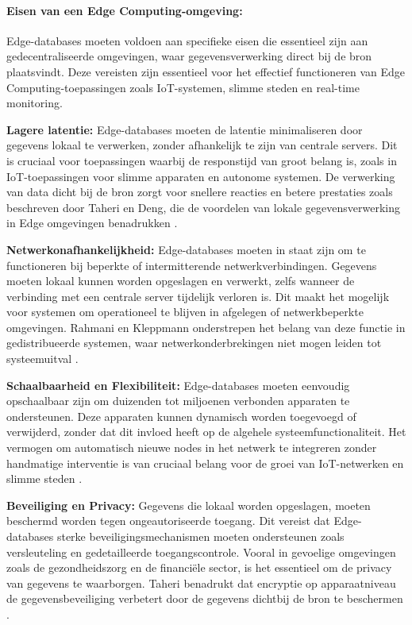 \paragraph{Eisen van een Edge Computing-omgeving:}
Edge-databases moeten voldoen aan specifieke eisen die essentieel zijn aan gedecentraliseerde omgevingen, waar gegevensverwerking direct bij de bron plaatsvindt. Deze vereisten zijn essentieel voor het effectief functioneren van Edge Computing-toepassingen zoals IoT-systemen, slimme steden en real-time monitoring.

\textbf{Lagere latentie:} 
   Edge-databases moeten de latentie minimaliseren door gegevens lokaal te verwerken, zonder afhankelijk te zijn van centrale servers. Dit is cruciaal voor toepassingen waarbij de responstijd van groot belang is, zoals in IoT-toepassingen voor slimme apparaten en autonome systemen. De verwerking van data dicht bij de bron zorgt voor snellere reacties en betere prestaties zoals beschreven door Taheri en Deng, die de voordelen van lokale gegevensverwerking in Edge omgevingen benadrukken \autocite{Taheri2020}.

\textbf{Netwerkonafhankelijkheid:}
   Edge-databases moeten in staat zijn om te functioneren bij beperkte of intermitterende netwerkverbindingen. Gegevens moeten lokaal kunnen worden opgeslagen en verwerkt, zelfs wanneer de verbinding met een centrale server tijdelijk verloren is. Dit maakt het mogelijk voor systemen om operationeel te blijven in afgelegen of netwerkbeperkte omgevingen. Rahmani en Kleppmann onderstrepen het belang van deze functie in gedistribueerde systemen, waar netwerkonderbrekingen niet mogen leiden tot systeemuitval \autocite{Rahmani2018, Kleppmann2017}.

\textbf{Schaalbaarheid en Flexibiliteit:}
   Edge-databases moeten eenvoudig opschaalbaar zijn om duizenden tot miljoenen verbonden apparaten te ondersteunen. Deze apparaten kunnen dynamisch worden toegevoegd of verwijderd, zonder dat dit invloed heeft op de algehele systeemfunctionaliteit. Het vermogen om automatisch nieuwe nodes in het netwerk te integreren zonder handmatige interventie is van cruciaal belang voor de groei van IoT-netwerken en slimme steden \autocite{Rahmani2018}.

\textbf{Beveiliging en Privacy:}
   Gegevens die lokaal worden opgeslagen, moeten beschermd worden tegen ongeautoriseerde toegang. Dit vereist dat Edge-databases sterke beveiligingsmechanismen moeten ondersteunen zoals versleuteling en gedetailleerde toegangscontrole. Vooral in gevoelige omgevingen zoals de gezondheidszorg en de financiële sector, is het essentieel om de privacy van gegevens te waarborgen. Taheri benadrukt dat encryptie op apparaatniveau de gegevensbeveiliging verbetert door de gegevens dichtbij de bron te beschermen \autocite{Taheri2020}.

